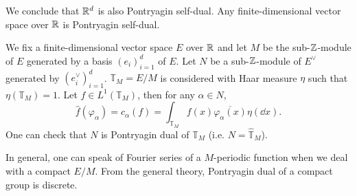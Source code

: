 \begin{remark}
    We conclude that $\mathbb{R}^d$ is also Pontryagin self-dual.
    Any finite-dimensional vector space over $\mathbb{R}$ is Pontryagin self-dual.
\end{remark}

\begin{exampleenv}
    We fix a finite-dimensional vector space $E$ over $\mathbb{R}$ and let $M$ be the sub-$\mathbb{Z}$-module of $E$ generated by a basis $(e_i)_{i=1}^{d}$ of $E$.
    Let $N$ be a sub-$\mathbb{Z}$-module of $E^\vee$ generated by $(e^\vee_i)_{i=1}^{d}$.
    $\mathbb{T}_{M} = E/M$ is considered with Haar measure $\eta$ such that $\eta(\mathbb{T}_{M}) = 1$.
    Let $f \in L^1(\mathbb{T}_{M})$, then for any $\alpha \in N$,
    $$\hat{f} (\varphi_{\alpha}) = c_{\alpha}(f) = \int_{\mathbb{T}_{M}} f(x) \overline{\varphi_{\alpha}(x)} \eta(\dd x).$$
    One can check that $N$ is Pontryagin dual of $\mathbb{T}_{M}$ (i.e. $N = \hat{\mathbb{T}}_{M}$).

    \quad In general, one can speak of Fourier series of a $M$-periodic function when we deal with a compact $E/M$.
    From the general theory, Pontryagin dual of a compact group is discrete.
\end{exampleenv}
